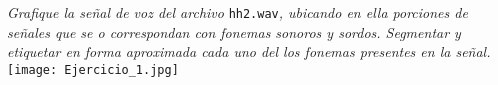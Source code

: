 


\emph{Grafique la señal de voz del archivo} \texttt{hh2.wav}\emph{, ubicando en ella porciones de señales que se o
correspondan con fonemas sonoros y sordos. Segmentar y etiquetar en forma aproximada cada
uno del los fonemas presentes en la señal.}\\


	{\centering
	\texttt{[image: Ejercicio\_1.jpg]}}
